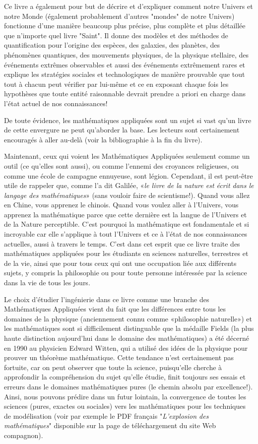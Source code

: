 	Ce livre a également pour but de décrire et d'expliquer comment notre Univers et notre Monde (également probablement d'autres "mondes" de notre Univers) fonctionne d'une manière beaucoup plus précise, plus complète et plus détaillée que n'importe quel livre "Saint". Il donne des modèles et des méthodes de quantification pour l'origine des espèces, des galaxies, des planètes, des phénomènes quantiques, des mouvements physiques, de la physique stellaire, des événements extrêmes observables et aussi des événements extrêmement rares et explique les stratégies sociales et technologiques de manière prouvable que tout tout à chacun peut vérifier par lui-même et ce en exposant chaque fois les hypothèses que toute entité raisonnable devrait prendre a priori en charge dans l'état actuel de nos connaissances!
	
	De toute évidence, les mathématiques appliquées sont un sujet si vast qu'un livre de cette envergure ne peut qu'aborder la base. Les lecteurs sont certainement encouragés à aller au-delà (voir la bibliographie à la fin du livre).

	Maintenant, ceux qui voient les Mathématiques Appliquées seulement comme un outil (ce qu'elles sont aussi), ou comme l'ennemi des croyances religieuses, ou comme une école de campagne ennuyeuse, sont légion. Cependant, il est peut-être utile de rappeler que, comme l'a dit Galilée, «\textit{le livre de la nature est écrit dans le langage des mathématiques}» (sans vouloir faire de scientisme!). Quand vous allez en Chine, vous apprenez le chinois. Quand vous voulez aller à l'Univers, vous apprenez la mathématique parce que cette dernière est la langue de l'Univers et de la Nature perceptible. C'est pourquoi la mathématique est fondamentale et si incroyable car elle s'applique à tout l'Univers et ce à l'état de nos connaissances actuelles, aussi à travers le temps. C'est dans cet esprit que ce livre traite des mathématiques appliquées pour les étudiants en sciences naturelles, terrestres et de la vie, ainsi que pour tous ceux qui ont une occupation liée aux différents sujets, y compris la philosophie ou pour toute personne intéressée par la science dans la vie de tous les jours.

	Le choix d'étudier l'ingénierie dans ce livre comme une branche des Mathématiques Appliquées vient du fait que les différences entre tous les domaines de la physique (anciennement connu comme «philosophie naturelle») et les mathématiques sont si difficilement distinguable que la médaille Fields (la plus haute distinction aujourd'hui dans le domaine des mathématiques) a été décerné en 1990 au physicien Edward Witten, qui a utilisé des idées de la physique pour prouver un théorème mathématique. Cette tendance n'est certainement pas fortuite, car on peut observer que toute la science, puisqu'elle cherche à approfondir la compréhension du sujet qu'elle étudie, finit toujours ses essais et erreurs dans le domaines mathématiques pures (le chemin absolu par excellence!). Ainsi, nous pouvons prédire dans un futur lointain, la convergence de toutes les sciences (pures, exactes ou sociales) vers les mathématiques pour les techniques de modélisation (voir par exemple le PDF français "\textit{L'explosion des mathématiques}" disponible sur la page de téléchargement du site Web compagnon).

